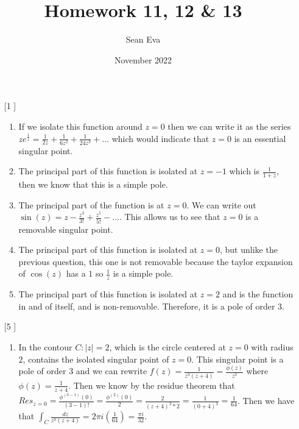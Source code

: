 \documentclass{article}
\title{Homework 11, 12 \& 13}
\author{Sean Eva}
\date{November 2022}
\theoremstyle{definition}
\begin{document}
\maketitle

\begin{enumerate}
    \item [[\phantom{-}1]]
    
    \begin{enumerate}
        \item 
        
        If we isolate this function around $z = 0$ then we can write it as the series $ze^\frac{1}{z} = \frac{1}{2z} + \frac{1}{6z^2} + \frac{1}{24z^3} + ...$ which would indicate that $z = 0$ is an essential singular point.
        
        \item
        
        The principal part of this function is isolated at $z = -1$ which is $\frac{1}{1 + z}$, then we know that this is a simple pole.
        
        \item
        
        The principal part of the function is at $z = 0$. We can write out $\sin(z) = z - \frac{z^3}{3!} + \frac{z^5}{5!} -...$. This allows us to see that $z = 0$ is a removable singular point. 
        
        \item
        
        The principal part of this function is isolated at $z = 0$, but unlike the previous question, this one is not removable because the taylor expansion of $\cos(z)$ has a $1$ so $\frac{1}{z}$ is a simple pole.
        
        \item
        
        The principal part of this function is isolated at $z = 2$ and is the function in and of itself, and is non-removable. Therefore, it is a pole of order 3.
        
    \end{enumerate}
    
    \item [[\phantom{-}5]]
    
    \begin{enumerate}
        \item 
        
        In the contour $C: |z| = 2$, which is the circle centered at $z = 0$ with radius $2$, contains the isolated singular point of $z = 0$. This singular point is a pole of order $3$ and we can rewrite $f(z) = \frac{1}{z^3(z + 4)} = \frac{\phi(z)}{z^3}$ where $\phi(z) = \frac{1}{z + 4}$. Then we know by the residue theorem that $Res_{z = 0} = \frac{\phi^{(3 - 1)}(0)}{(3 - 1)!} = \frac{\phi^{(2)}(0)}{2} = \frac{2}{(z+4)^3 * 2} = \frac{1}{(0+4)^3} = \frac{1}{64}$. Then we have that $\int_{C}\frac{dz}{z^3(z + 4)} = 2\pi i (\frac{1}{64}) = \frac{\pi i}{32}.$
        

\end{enumerate}
\end{enumerate}
\end{document}
